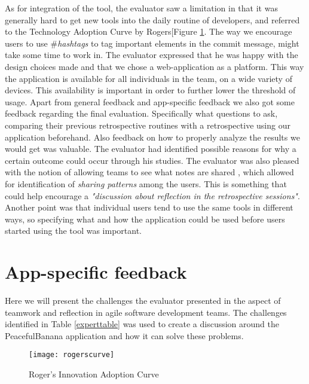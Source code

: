 As for integration of the tool, the evaluator saw a limitation in that it was generally hard to get new tools into the daily routine of developers\cite{rogers2010diffusion}, and referred to the Technology Adoption Curve by Rogers[Figure \ref{rogerscurve}. The way we encourage users to use \#\emph{hashtags} to tag important elements in the commit message, might take some time to work in. The evaluator expressed that he was happy with the design choices made and that we chose a web-application as a platform. This way the application is available for all individuals in the team, on a wide variety of devices. This availability is important in order to further lower the threshold of usage. Apart from general feedback and app-specific feedback we also got some feedback regarding the final evaluation. Specifically what questions to ask, comparing their previous retrospective routines with a retrospective using our application beforehand. Also feedback on how to properly analyze the results we would get was valuable. The evaluator had identified possible reasons for why a certain outcome could occur through his studies. The evaluator was also pleased with the notion of allowing teams to see what notes are shared , which allowed for identification of \emph{sharing patterns} among the users. This is something that could help encourage a \emph{"discussion about reflection in the retrospective sessions"}. Another point was that individual users tend to use the same tools in different ways, so specifying what and how the application could be used before users started using the tool was important.  
\section{App-specific feedback}
Here we will present the challenges the evaluator presented in the aspect of teamwork and reflection in agile software development teams. The challenges identified in Table \ref{experttable} was used to create a discussion around the PeacefulBanana application and how it can solve these problems. 
\begin{figure}[h!]
    \centering
        \texttt{[image: rogerscurve]}
    \caption{Roger's Innovation Adoption Curve}
    \label{rogerscurve}
\end{figure}

